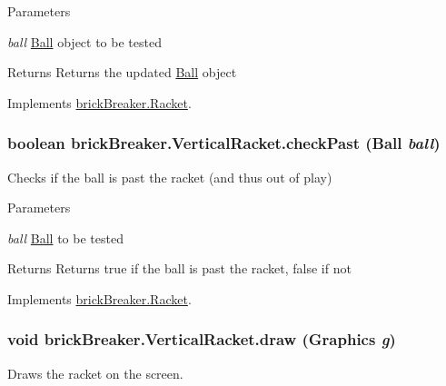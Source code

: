 \begin{DoxyParams}{Parameters}
\item[{\em ball}]\hyperlink{classbrick_breaker_1_1_ball}{Ball} object to be tested \end{DoxyParams}
\begin{DoxyReturn}{Returns}
Returns the updated \hyperlink{classbrick_breaker_1_1_ball}{Ball} object 
\end{DoxyReturn}


Implements \hyperlink{classbrick_breaker_1_1_racket_a81880bdbdfda6ec88d1d4e7fc72f8f74}{brickBreaker.Racket}.

\hypertarget{classbrick_breaker_1_1_vertical_racket_ac9edcb855d560fa5771da4e12abb4e71}{
\subsubsection[{checkPast}]{\setlength{\rightskip}{0pt plus 5cm}boolean brickBreaker.VerticalRacket.checkPast ({\bf Ball} {\em ball})}}
\label{classbrick_breaker_1_1_vertical_racket_ac9edcb855d560fa5771da4e12abb4e71}
Checks if the ball is past the racket (and thus out of play)


\begin{DoxyParams}{Parameters}
\item[{\em ball}]\hyperlink{classbrick_breaker_1_1_ball}{Ball} to be tested \end{DoxyParams}
\begin{DoxyReturn}{Returns}
Returns true if the ball is past the racket, false if not 
\end{DoxyReturn}


Implements \hyperlink{classbrick_breaker_1_1_racket_a129dbc802cd26299ebca916283edbe27}{brickBreaker.Racket}.

\hypertarget{classbrick_breaker_1_1_vertical_racket_ac455ce02602cbf621997042439809ee5}{
\subsubsection[{draw}]{\setlength{\rightskip}{0pt plus 5cm}void brickBreaker.VerticalRacket.draw (Graphics {\em g})}}
\label{classbrick_breaker_1_1_vertical_racket_ac455ce02602cbf621997042439809ee5}
Draws the racket on the screen.


